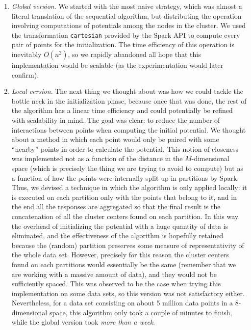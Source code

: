 \begin{enumerate}[1.]
\item \textit{Global version}. We started with the most naive strategy, which was almost a literal translation of the sequential algorithm, but distributing the operation involving computations of potentials among the nodes in the cluster. We used the transformation \verb|cartesian| provided by the Spark API to compute every pair of points for the initialization. The time efficiency of this operation is inevitably $O(n^2)$, so we rapidly abandoned all hope that this implementation would be scalable (as the experimentation would later confirm).
\item \textit{Local version}. The next thing we thought about was how we could tackle the bottle neck in the initialization phase, because once that was done, the rest of the algorithm has a linear time efficiency and could potentially be refined with scalability in mind. The goal was clear: to reduce the number of interactions between points when computing the initial potential. We thought about a method in which each point would only be paired with some ``nearby'' points in order to calculate the potential. This notion of closeness was implemented not as a function of the distance in the $M$-dimensional space (which is precisely the thing we are trying to avoid to compute) but as a function of how the points were internally split up in partitions by Spark. Thus, we devised a technique in which the algorithm is only applied locally: it is executed on each partition only with the points that belong to it, and in the end all the responses are aggregated so that the final result is the concatenation of all the cluster centers found on each partition. In this way the overhead of initializing the potential with a huge quantity of data is eliminated, and the effectiveness of the algorithm is hopefully retained because the (random) partition preserves some measure of representativity of the whole data set. However, precisely for this reason the cluster centers found on each partitions would essentially be the same (remember that we are working with a massive amount of data), and they would not be sufficiently spaced. This was observed to be the case when trying this implementation on some data sets, so this version was not satisfactory either. Nevertheless, for a data set consisting on about 5 million data points in a 8-dimensional space, this algorithm only took a couple of minutes to finish, while the global version took \textit{more than a week}.

\end{enumerate}

